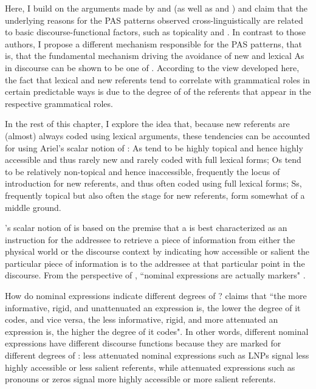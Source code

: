 Here, I build on the arguments made by \citet{haspelmath2006} and \citet{everett2009} (as well as \citealt{haig2016} and \citealt{schnell2017}) and claim that the underlying reasons for the PAS patterns observed cross-linguistically are related to basic discourse-functional factors, such as topicality and . In contrast to those authors, I propose a different mechanism responsible for the PAS patterns, that is, that the fundamental mechanism driving the avoidance of new and lexical As in discourse can be shown to be one of  \citep{ariel1990,ariel2001}. According to the view developed here, the fact that lexical and new referents tend to correlate with grammatical roles in certain predictable ways is due to the degree of  of the referents that appear in the respective grammatical roles.

In the rest of this chapter, I explore the idea that, because new referents are (almost) always coded using lexical arguments, these tendencies can be accounted for using Ariel's scalar notion of  \citep{ariel1990,ariel2001}: As tend to be highly topical and hence highly accessible and thus rarely new and rarely coded with full lexical forms; Os tend to be relatively non-topical and hence inaccessible, frequently the locus of introduction for new referents, and thus often coded using full lexical forms; Ss, frequently topical but also often the stage for new referents, form somewhat of a middle ground.

\citet{ariel1990,ariel2001}'s scalar notion of  is based on the premise that a  is best characterized as an instruction for the addressee to retrieve a piece of information from either the physical world or the discourse context by indicating how accessible or salient the particular piece of information is to the addressee at that particular point in the discourse. From the perspective of , ``nominal expressions are actually  markers" \citep[31]{ariel2001}. 

How do nominal expressions indicate different degrees of ? \citet[32]{ariel2001} claims that ``the more informative, rigid, and unattenuated an expression is, the lower the degree of  it codes, and vice versa, the less informative, rigid, and more attenuated an expression is, the higher the degree of  it codes". In other words, different nominal expressions have different discourse functions because they are marked for different degrees of : less attenuated nominal expressions such as LNPs signal less highly accessible or less salient referents, while attenuated expressions such as pronouns or zeros signal more highly accessible or more salient referents. 

